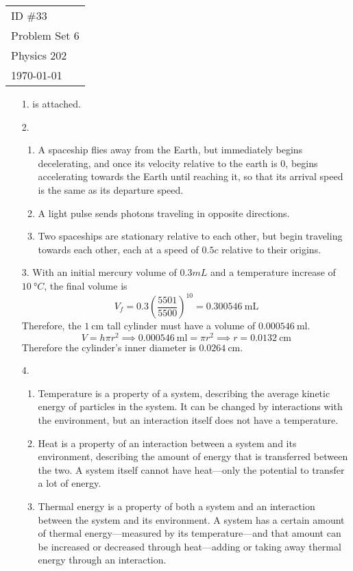 \documentclass[fleqn]{article}[12pt]
\begin{document}
    \begin{tabular}{l}
        ID \#33 \\
        Problem Set 6 \\
        Physics 202 \\
        \today
    \end{tabular}

\begin{enumerate}
    \item[1.] is attached.
    \item[2.] \begin{enumerate}
        \item A spaceship flies away from the Earth, but immediately begins decelerating, and once its velocity relative to the earth is 0, begins accelerating towards the Earth until reaching it, so that its arrival speed is the same as its departure speed.

        \item A light pulse sends photons traveling in opposite directions.

        \item Two spaceships are stationary relative to each other, but begin traveling towards each other, each at a speed of $0.5c$ relative to their origins.
    \end{enumerate}

    \item[3.] With an initial mercury volume of $0.3mL$ and a temperature increase of $\SI{10}{\degree}C$, the final volume is
    \begin{equation*}
        V_f = 0.3 \left(\frac{5501}{5500}\right)^{10} = \SI{0.300546}{\milli\liter}
    \end{equation*}
    Therefore, the $\SI{1}{\cm}$ tall cylinder must have a volume of $\SI{0.000546}{\ml}$.
    \begin{equation*}
        V = h \pi r^2 \implies \SI{0.000546}{\ml} = \pi r^2 \implies r = \SI{0.0132}{\cm}
    \end{equation*}
    Therefore the cylinder's inner diameter is $\SI{0.0264}{\cm}$.

    \item[4.] \begin{enumerate}
        \item Temperature is a property of a system, describing the average kinetic energy of particles in the system. It can be changed by interactions with the environment, but an interaction itself does not have a temperature.
        \item Heat is a property of an interaction between a system and its environment, describing the amount of energy that is transferred between the two. A system itself cannot have heat---only the potential to transfer a lot of energy.
        \item Thermal energy is a property of both a system and an interaction between the system and its environment. A system has a certain amount of thermal energy---measured by its temperature---and that amount can be increased or decreased through heat---adding or taking away thermal energy through an interaction.
    \end{enumerate}


\end{enumerate}
\end{document}
